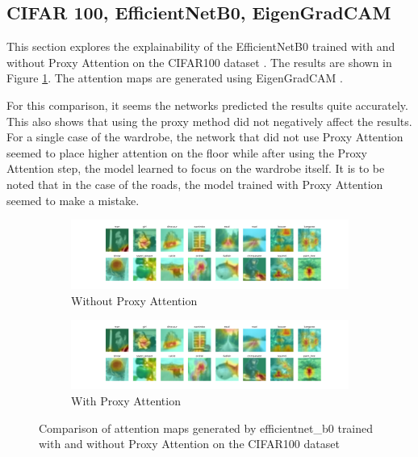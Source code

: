 \documentclass[a4paper,11pt,openright]{book}
\begin{document}
\subsection{CIFAR 100, EfficientNetB0, EigenGradCAM}
This section explores the explainability of the EfficientNetB0 \cite{tanEfficientnetRethinkingModel2019} trained with and without Proxy Attention on the CIFAR100 dataset \cite{krizhevskyLearningMultipleLayers}. The results are shown in Figure \ref{fig:efficientnet_b0_cifar100}. The attention maps are generated using EigenGradCAM \cite{banymuhammadEigenCAMVisualExplanations2021}.

For this comparison, it seems the networks predicted the results quite accurately. This also shows that using the proxy method did not negatively affect the results. For a single case of the wardrobe, the network that did not use Proxy Attention seemed to place higher attention on the floor while after using the Proxy Attention step, the model learned to focus on the wardrobe itself. It is to be noted that in the case of the roads, the model trained with Proxy Attention seemed to make a mistake.

\begin{figure}[!htb]
    \begin{subfigure}[b]{1\textwidth}
        \includegraphics[width=\linewidth]{images/cifar100_efficientnet_b0_noproxy_0.pdf}
        \caption{Without Proxy Attention}
    \end{subfigure}
    \begin{subfigure}[b]{1\textwidth}
        \includegraphics[width=\linewidth]{images/cifar100_efficientnet_b0_proxy_0.pdf}
        \caption{With Proxy Attention}
    \end{subfigure}

    \caption{Comparison of attention maps generated by efficientnet\_b0 trained with and without Proxy Attention on the CIFAR100 dataset}
    \label{fig:efficientnet_b0_cifar100}
\end{figure}
    
\end{document}
